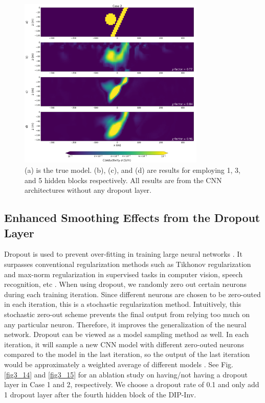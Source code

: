 \documentclass[lettersize,journal]{IEEEtran}
\begin{document}
\begin{figure}[!t]
\centering
\includegraphics[width=3.5in]{Figures/xu14.png}
\caption{(a) is the true model. (b), (c), and (d) are results for employing 1, 3, and 5 hidden blocks respectively. All results are from the CNN architectures without any dropout layer. }
\label{fig3_13}
\end{figure}

\subsection{Enhanced Smoothing Effects from the Dropout Layer}
\label{sec:4.4}
Dropout is used to prevent over-fitting in training large neural networks \cite{ref23}. It surpasses conventional regularization methods such as Tikhonov regularization and max-norm regularization in supervised tasks in computer vision, speech recognition, etc \cite{ref23}. When using dropout, we randomly zero out certain neurons during each training iteration. Since different neurons are chosen to be zero-outed in each iteration, this is a stochastic regularization method. Intuitively, this stochastic zero-out scheme prevents the final output from relying too much on any particular neuron. Therefore, it improves the generalization of the neural network. Dropout can be viewed as a model sampling method as well. In each iteration, it will sample a new CNN model with different zero-outed neurons compared to the model in the last iteration, so the output of the last iteration would be approximately a weighted average of different models \cite{ref23}. See Fig. \ref{fig3_14} and \ref{fig3_15} for an ablation study on having/not having a dropout layer in Case 1 and 2, respectively. We choose a dropout rate of 0.1 and only add 1 dropout layer after the fourth hidden block of the DIP-Inv. 
\end{document}
